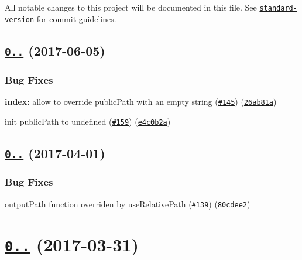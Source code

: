 All notable changes to this project will be documented in this file. See \href{https://github.com/conventional-changelog/standard-version}{\tt standard-\/version} for commit guidelines.

\label{_0.11.2}%
 \subsection*{\href{https://github.com/webpack/file-loader/compare/v0.11.1...v0.11.2}{\tt 0..} (2017-\/06-\/05)}

\subsubsection*{Bug Fixes}


\begin{DoxyItemize}
\item {\bfseries index\+:} allow to override public\+Path with an empty string (\href{https://github.com/webpack/file-loader/issues/145}{\tt \#145}) (\href{https://github.com/webpack/file-loader/commit/26ab81a}{\tt 26ab81a})
\item init {\ttfamily public\+Path} to undefined (\href{https://github.com/webpack/file-loader/issues/159}{\tt \#159}) (\href{https://github.com/webpack/file-loader/commit/e4c0b2a}{\tt e4c0b2a})
\end{DoxyItemize}

\label{_0.11.1}%
 \subsection*{\href{https://github.com/webpack/file-loader/compare/v0.11.0...v0.11.1}{\tt 0..} (2017-\/04-\/01)}

\subsubsection*{Bug Fixes}


\begin{DoxyItemize}
\item output\+Path function overriden by use\+Relative\+Path (\href{https://github.com/webpack/file-loader/issues/139}{\tt \#139}) (\href{https://github.com/webpack/file-loader/commit/80cdee2}{\tt 80cdee2})
\end{DoxyItemize}

\label{_0.11.0}%
 \section*{\href{https://github.com/webpack/file-loader/compare/v0.10.1...v0.11.0}{\tt 0..} (2017-\/03-\/31)}

